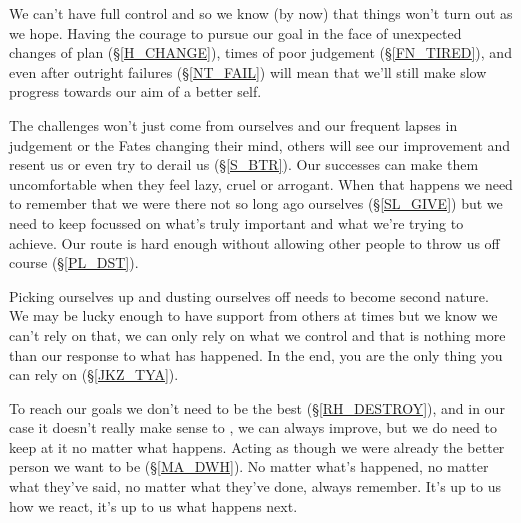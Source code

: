 \cleardoublepage
{\small

We can't have full control and so we know (by now) that things won't turn out as we hope. Having the courage to pursue our goal in the face of unexpected changes of plan (\S \ref{H_CHANGE}), times of poor judgement (\S \ref{FN_TIRED}), and even after outright failures (\S \ref{NT_FAIL}) will mean that we'll still make slow progress towards our aim of a better self. 

The challenges won't just come from ourselves and our frequent lapses in judgement or the Fates changing their mind, others will see our improvement and resent us or even try to derail us (\S \ref{S_BTR}). Our successes can make them uncomfortable when they feel lazy, cruel or arrogant. When that happens we need to remember that we were there not so long ago ourselves (\S \ref{SL_GIVE}) but we need to keep focussed on what's truly important and what we're trying to achieve. Our route is hard enough without allowing other people to throw us off course (\S \ref{PL_DST}).

Picking ourselves up and dusting ourselves off needs to become second nature. We may be lucky enough to have support from others at times but we know we can't rely on that, we can only rely on what we control and that is nothing more than our response to what has happened. In the end, you are the only thing you can rely on (\S \ref{JKZ_TYA}).

To reach our goals we don't need to be the best (\S \ref{RH_DESTROY}), and in our case it doesn't really make sense to , we can always improve, but we do need to keep at it no matter what happens. Acting as though we were already the better person we want to be (\S \ref{MA_DWH}).
\newline
No matter what's happened, no matter what they've said, no matter what they've done, always remember. It's up to us how we react, it's up to us what happens next.

}
